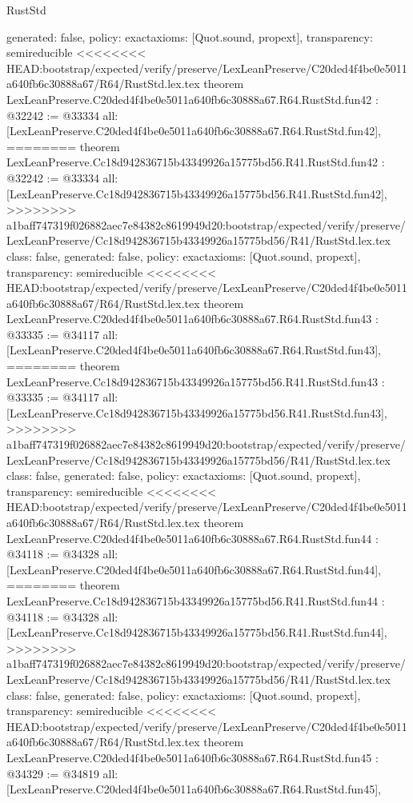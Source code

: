 \begin{lexlean}{RustStd}
\begin{coremodule}
{\begin{coremodule}
{{{{{{{{{{{{{{{{{{{{{{{{{{{{{{{{{{{{{{{{{{{{{  generated: false,
  policy: exact{axioms: [Quot.sound, propext]},
  transparency: semireducible
}
<<<<<<<< HEAD:bootstrap/expected/verify/preserve/LexLeanPreserve/C20ded4f4be0e5011a640fb6c30888a67/R64/RustStd.lex.tex
theorem LexLeanPreserve.C20ded4f4be0e5011a640fb6c30888a67.R64.RustStd.fun42 : @32242 := @33334 {
  all: [LexLeanPreserve.C20ded4f4be0e5011a640fb6c30888a67.R64.RustStd.fun42],
========
theorem LexLeanPreserve.Cc18d942836715b43349926a15775bd56.R41.RustStd.fun42 : @32242 := @33334 {
  all: [LexLeanPreserve.Cc18d942836715b43349926a15775bd56.R41.RustStd.fun42],
>>>>>>>> a1baff747319f026882aec7e84382c8619949d20:bootstrap/expected/verify/preserve/LexLeanPreserve/Cc18d942836715b43349926a15775bd56/R41/RustStd.lex.tex
  class: false,
  generated: false,
  policy: exact{axioms: [Quot.sound, propext]},
  transparency: semireducible
}
<<<<<<<< HEAD:bootstrap/expected/verify/preserve/LexLeanPreserve/C20ded4f4be0e5011a640fb6c30888a67/R64/RustStd.lex.tex
theorem LexLeanPreserve.C20ded4f4be0e5011a640fb6c30888a67.R64.RustStd.fun43 : @33335 := @34117 {
  all: [LexLeanPreserve.C20ded4f4be0e5011a640fb6c30888a67.R64.RustStd.fun43],
========
theorem LexLeanPreserve.Cc18d942836715b43349926a15775bd56.R41.RustStd.fun43 : @33335 := @34117 {
  all: [LexLeanPreserve.Cc18d942836715b43349926a15775bd56.R41.RustStd.fun43],
>>>>>>>> a1baff747319f026882aec7e84382c8619949d20:bootstrap/expected/verify/preserve/LexLeanPreserve/Cc18d942836715b43349926a15775bd56/R41/RustStd.lex.tex
  class: false,
  generated: false,
  policy: exact{axioms: [Quot.sound, propext]},
  transparency: semireducible
}
<<<<<<<< HEAD:bootstrap/expected/verify/preserve/LexLeanPreserve/C20ded4f4be0e5011a640fb6c30888a67/R64/RustStd.lex.tex
theorem LexLeanPreserve.C20ded4f4be0e5011a640fb6c30888a67.R64.RustStd.fun44 : @34118 := @34328 {
  all: [LexLeanPreserve.C20ded4f4be0e5011a640fb6c30888a67.R64.RustStd.fun44],
========
theorem LexLeanPreserve.Cc18d942836715b43349926a15775bd56.R41.RustStd.fun44 : @34118 := @34328 {
  all: [LexLeanPreserve.Cc18d942836715b43349926a15775bd56.R41.RustStd.fun44],
>>>>>>>> a1baff747319f026882aec7e84382c8619949d20:bootstrap/expected/verify/preserve/LexLeanPreserve/Cc18d942836715b43349926a15775bd56/R41/RustStd.lex.tex
  class: false,
  generated: false,
  policy: exact{axioms: [Quot.sound, propext]},
  transparency: semireducible
}
<<<<<<<< HEAD:bootstrap/expected/verify/preserve/LexLeanPreserve/C20ded4f4be0e5011a640fb6c30888a67/R64/RustStd.lex.tex
theorem LexLeanPreserve.C20ded4f4be0e5011a640fb6c30888a67.R64.RustStd.fun45 : @34329 := @34819 {
  all: [LexLeanPreserve.C20ded4f4be0e5011a640fb6c30888a67.R64.RustStd.fun45],
}}}}}}}}}}}}}}}}}}}}}}}}}}}}}}}}}}}}}}}}}}}}}}}}
\end{coremodule}}
\end{coremodule}
\end{lexlean}
